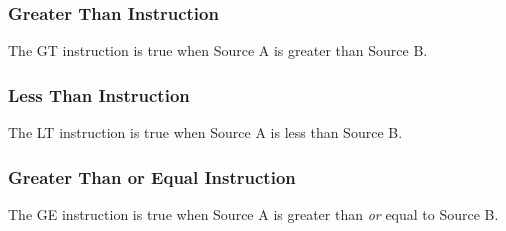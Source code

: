 \begin{frame}
    \frametitle{Greater Than Instruction}

    \begin{figure}
        \centering
        \resizebox{0.625\linewidth}{!}{
            
        }

        \resizebox{0.625\linewidth}{!}{
            
        }

        \resizebox{0.625\linewidth}{!}{
        
        }
    \end{figure}

    \vspace{0.5em}
    \centering
    {\footnotesize The GT instruction is true when Source A is greater than Source B.\par}
\end{frame}

\begin{frame}
    \frametitle{Less Than Instruction}

    \begin{figure}
        \centering
        \resizebox{0.625\linewidth}{!}{
            
        }

        \resizebox{0.625\linewidth}{!}{
            
        }

        \resizebox{0.625\linewidth}{!}{
        
        }
    \end{figure}

    \vspace{0.5em}
    \centering
    {\footnotesize The LT instruction is true when Source A is less than Source B.\par}
\end{frame}

\begin{frame}
    \frametitle{Greater Than or Equal Instruction}

    \begin{figure}
        \centering
        \resizebox{0.625\linewidth}{!}{
            
        }

        \resizebox{0.625\linewidth}{!}{
            
        }

        \resizebox{0.625\linewidth}{!}{
        
        }
    \end{figure}

    \vspace{0.5em}
    \centering
    {\footnotesize The GE instruction is true when Source A is greater than \emph{or} equal to Source B.\par}
\end{frame}

